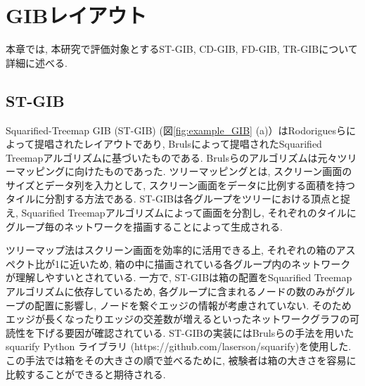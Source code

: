 \documentclass{kuee}
\begin{document}





\appendix

\chapter{GIBレイアウト}
\label{chap:gib_detail}
本章では, 本研究で評価対象とするST-GIB, CD-GIB, FD-GIB, TR-GIBについて詳細に述べる.

\section{ST-GIB}
Squarified-Treemap GIB (ST-GIB) (図\ref{fig:example_GIB} (a)）はRodoriguesら\cite{rodrigues2011group}によって提唱されたレイアウトであり, Brulsによって提唱されたSquarified Treemapアルゴリズム\cite{bruls2000squarified}に基づいたものである.
Brulsらのアルゴリズムは元々ツリーマッピングに向けたものであった.
ツリーマッピングとは, スクリーン画面のサイズとデータ列を入力として, スクリーン画面をデータに比例する面積を持つタイルに分割する方法である\cite{shneiderman1992tree}.
ST-GIBは各グループをツリーにおける頂点と捉え, Squarified Treemapアルゴリズムによって画面を分割し, それぞれのタイルにグループ毎のネットワークを描画することによって生成される.

ツリーマップ法はスクリーン画面を効率的に活用できる上, それぞれの箱のアスペクト比が1に近いため, 箱の中に描画されている各グループ内のネットワークが理解しやすいとされている\cite{bruls2000squarified}.
一方で, ST-GIBは箱の配置をSquarified Treemapアルゴリズムに依存しているため, 各グループに含まれるノードの数のみがグループの配置に影響し, ノードを繋ぐエッジの情報が考慮されていない.
そのためエッジが長くなったりエッジの交差数が増えるといったネットワークグラフの可読性を下げる要因が確認されている.
ST-GIBの実装にはBrulsらの手法を用いたsquarify Python ライブラリ (https://github.com/laserson/squarify)を使用した.
この手法では箱をその大きさの順で並べるために, 被験者は箱の大きさを容易に比較することができると期待される.
\end{document}
